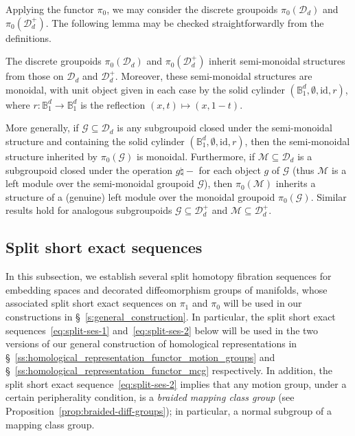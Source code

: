 \documentclass[AHL,Unicode,published]{cedram}
\newcommand{\id}{\mathrm{id}}
\newcommand{\cD}{\mathcal{D}}
\newcommand{\cG}{\mathcal{G}}
\newcommand{\cM}{\mathcal{M}}
\newcommand{\bB}{\mathbb{B}}
\begin{document}
Applying the functor $\pi_{0}$, we may consider the discrete groupoids $\pi_{0}(\cD_{d})$ and $\pi_{0}(\cD_{d}^{+})$. The following lemma may be checked straightforwardly from the definitions.

\begin{lemm}\label{lem:monoidal-pi0}
The discrete groupoids $\pi_{0}(\cD_{d})$ and $\pi_{0}(\cD_{d}^{+})$ inherit semi-monoidal structures from those on $\cD_{d}$ and $\cD_{d}^{+}$. Moreover, these semi-monoidal structures are monoidal, with unit object given in each case by the solid cylinder $(\bB^d_{1},\emptyset,\id,r)$, where $r \colon \bB^d_{1} \to \bB^d_{1}$ is the reflection $(x,t) \mapsto (x,1-t)$.

More generally, if $\cG \subseteq \cD_{d}$ is any subgroupoid closed under the semi-monoidal structure and containing the solid cylinder $(\bB^d_{1},\emptyset,\id,r)$, then the semi-monoidal structure inherited by $\pi_{0}(\cG)$ is monoidal. Furthermore, if $\cM \subseteq \cD_{d}$ is a subgroupoid closed under the operation $g \natural -$ for each object $g$ of $\cG$ (thus $\cM$ is a left module over the semi-monoidal groupoid $\cG$), then $\pi_{0}(\cM)$ inherits a structure of a (genuine) left module over the monoidal groupoid $\pi_{0}(\cG)$. Similar results hold for analogous subgroupoids $\cG \subseteq \cD_{d}^{+}$ and $\cM \subseteq \cD_{d}^{+}$.
\end{lemm}


\subsection{Split short exact sequences}\label{ss:split-ses}

In this subsection, we establish several split homotopy fibration sequences for embedding spaces and decorated diffeomorphism groups of manifolds, whose associated split short exact sequences on $\pi_{1}$ and $\pi_{0}$ will be used in our constructions in \S~\ref{s:general_construction}. In particular, the split short exact sequences~\eqref{eq:split-ses-1} and~\eqref{eq:split-ses-2} below will be used in the two versions of our general construction of homological representations in \S~\ref{ss:homological_representation_functor_motion_groups} and \S~\ref{ss:homological_representation_functor_mcg} respectively. In addition, the split short exact sequence~\eqref{eq:split-ses-2} implies that any motion group, under a certain peripherality condition, is a \emph{braided mapping class group} (see Proposition~\ref{prop:braided-diff-groups}); in particular, a normal subgroup of a mapping class group.
\end{document}
